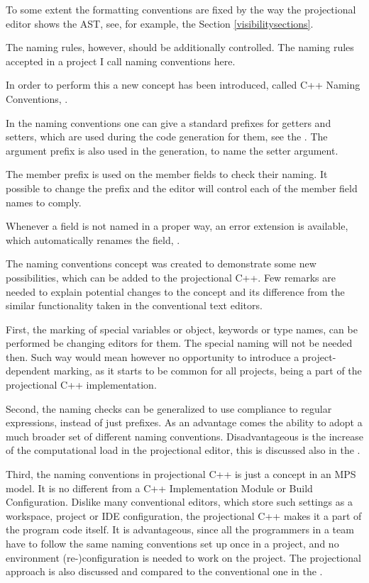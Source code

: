To some extent the formatting conventions are fixed
by the way the projectional editor shows the AST, see, for example, the Section \ref{visibilitysections}.

The naming rules, however, should be additionally controlled. The naming rules accepted in a project I call 
naming conventions here.

In order to perform this a new concept has been introduced, called C++ Naming Conventions, .


In the naming conventions one can give a standard prefixes for getters and setters, which are used during the code 
generation for them, see the . The argument prefix is also used in the generation, to name the
setter argument.

The member prefix is used on the member fields to check their naming. It possible to change the prefix and the editor will control
each of the member field names to comply.

Whenever a field is not named in a proper way, an error extension is available, which automatically renames the field, .


The naming conventions concept was created to demonstrate some new possibilities, which can be added to the projectional C++.
Few remarks are needed to explain potential changes to the concept and its difference from the similar functionality taken
in the conventional text editors.

First, the marking of special variables or object, keywords or type names, can be performed be changing editors for them. The special
naming will not be needed then. Such way would mean however no opportunity to introduce a project-dependent marking, as it starts to be
common for all projects, being a part of the projectional C++ implementation.

Second, the naming checks can be generalized to use compliance to regular expressions, instead of just prefixes. As an advantage comes the
ability to adopt a much broader set of different naming conventions. Disadvantageous is the increase
of the computational load in the projectional editor, this is discussed also in the .

Third, the naming conventions in projectional C++ is just a concept in an MPS model. It is no different from a C++ Implementation Module
or Build Configuration. Dislike many conventional editors, which store such settings as a workspace, project or IDE configuration, the
projectional C++ makes it a part of the program code itself. It is advantageous, since all the programmers in a team have to follow the 
same naming conventions set up once in a project, and no environment (re-)configuration is needed to work on the project. The projectional
approach is also discussed and compared to the conventional one in the .


